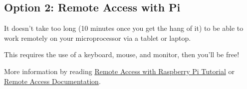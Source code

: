 \documentclass{article}\usepackage[]{graphicx}\usepackage[]{color}
\begin{document}
\subsection{Option 2: Remote Access with Pi}

It doesn't take too long (10 minutes once you get the hang of it) to be able to work remotely on your microprocessor via a tablet or laptop.  

This requires the use of a keyboard, mouse, and monitor, then you'll be free!

More information by reading \href{https://pythonprogramming.net/remote-access-raspberry-pi-tutorials/?completed=/introduction-raspberry-pi-tutorials/}{Remote Access with Raspberry Pi Tutorial} or \href{https://www.raspberrypi.org/documentation/remote-access/ip-address.md}{Remote Access Documentation}.
\end{document}
